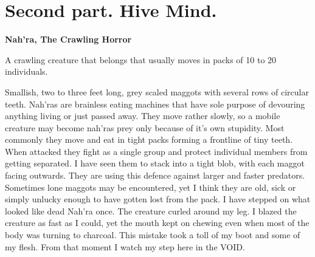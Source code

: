 \documentclass[14p]{book}
\begin{document}
\section{Second part. Hive Mind.}

\textbf{Nah'ra, The Crawling Horror}

A crawling creature that belongs that usually moves in packs of 10 to 20 individuals.


Smallish, two to three feet long, grey scaled maggots with several rows of circular teeth. Nah’ras are brainless eating machines that have sole purpose of devouring anything living or just passed away. They move rather slowly, so a mobile creature may become nah’ras prey only because of it’s own stupidity. Most commonly they move and eat in tight packs forming a frontline of tiny teeth. When attacked they fight as a single group and protect individual members from getting separated. I have seen them to stack into a tight blob, with each maggot facing outwards. They are using this defence against larger and faster predators. Sometimes lone maggots may be encountered, yet I think they are old, sick or simply unlucky enough to have gotten lost from the pack. I have stepped on what looked like dead Nah'ra once. The creature curled around my leg. I blazed the creature as fast as I could, yet the mouth kept on chewing even when most of the body was turning to charcoal. This mistake took a toll of my boot and some of my flesh. From that moment I watch my step here in the VOID.
\end{document}
